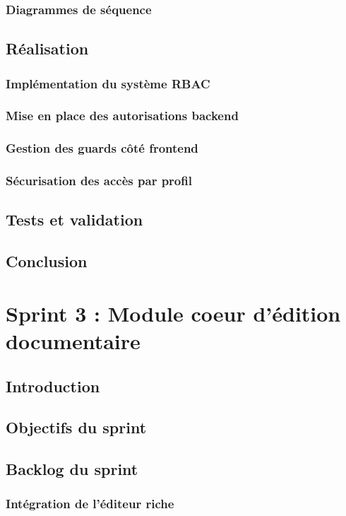 \documentclass[12pt,a4paper]{report}
\begin{document}
\subsection{Diagrammes de séquence}
\section{Réalisation}
\subsection{Implémentation du système RBAC}
\subsection{Mise en place des autorisations backend}
\subsection{Gestion des guards côté frontend}
\subsection{Sécurisation des accès par profil}
\section{Tests et validation}
\section{Conclusion}


\chapter{Sprint 3 : Module coeur d'édition documentaire}

\section{Introduction}
\section{Objectifs du sprint}
\section{Backlog du sprint}
\subsection{Intégration de l'éditeur riche}
\end{document}
